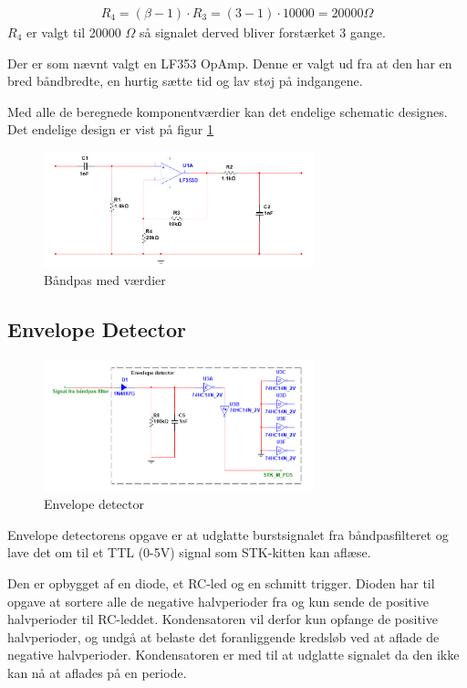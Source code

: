 \begin{align}
R_4 = (\beta - 1) \cdot R_3 = (3 - 1) \cdot 10000 = 20000 \Omega
\end{align} 
$R_4$ er valgt til 20000 $\Omega$ så signalet derved bliver forstærket 3 gange.

Der er som nævnt valgt en LF353 OpAmp. Denne er valgt ud fra at den har en bred båndbredte, en hurtig sætte tid og lav støj på indgangene. 

Med alle de beregnede komponentværdier kan det endelige schematic designes. Det endelige design er vist på figur \ref{fig:BAANDPAS_MV} 

\begin{figure}[htbp]
	\centering
	\includegraphics[width=0.70\textwidth]{billeder/HWdesign/BAANDPAS_MV.png}
	\caption{Båndpas med værdier}
	\label{fig:BAANDPAS_MV}
\end{figure}
 

\newpage

\subsection{Envelope Detector}

\begin{figure}[htbp]
	\centering
	\includegraphics[width=0.70\textwidth]{billeder/HWdesign/ED_MV.png}
	\caption{Envelope detector}
	\label{fig:ED_MV}
\end{figure}

Envelope detectorens opgave er at udglatte burstsignalet fra båndpasfilteret og lave det om til et TTL (0-5V) signal som STK-kitten kan aflæse.

Den er opbygget af en diode, et RC-led og en schmitt trigger. Dioden har til opgave at sortere alle de negative halvperioder fra og kun sende de positive halvperioder til RC-leddet. Kondensatoren vil derfor kun opfange de positive halvperioder, og undgå at belaste det foranliggende kredsløb ved at aflade de negative halvperioder. Kondensatoren er med til at udglatte signalet da den ikke kan nå at aflades på en periode.

